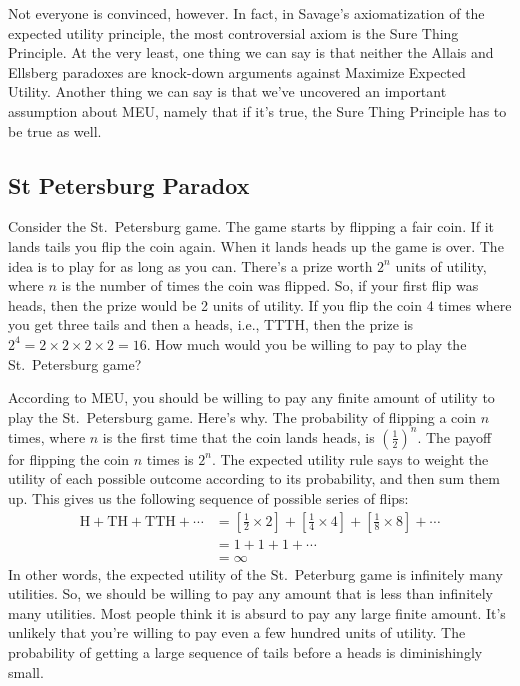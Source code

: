 \documentclass[]{tufte-book}
\begin{document}
Not everyone is convinced, however. In fact, in Savage's axiomatization of the expected utility principle, the most controversial axiom is the Sure Thing Principle. At the very least, one thing we can say is that neither the Allais and Ellsberg paradoxes are knock-down arguments against Maximize Expected Utility. Another thing we can say is that we've uncovered an important assumption about MEU, namely that if it's true, the Sure Thing Principle has to be true as well.

\hypertarget{st-petersburg-paradox}{%
\subsection{St Petersburg Paradox}\label{st-petersburg-paradox}}

Consider the St.~Petersburg game. The game starts by flipping a fair coin. If it lands tails you flip the coin again. When it lands heads up the game is over. The idea is to play for as long as you can. There's a prize worth \(2^n\) units of utility, where \(n\) is the number of times the coin was flipped. So, if your first flip was heads, then the prize would be 2 units of utility. If you flip the coin 4 times where you get three tails and then a heads, i.e., TTTH, then the prize is \(2^4=2\times2\times2\times2=16\). How much would you be willing to pay to play the St.~Petersburg game?

According to MEU, you should be willing to pay any finite amount of utility to play the St.~Petersburg game. Here's why. The probability of flipping a coin \(n\) times, where \(n\) is the first time that the coin lands heads, is \((\frac{1}{2})^n\). The payoff for flipping the coin \(n\) times is \(2^n\). The expected utility rule says to weight the utility of each possible outcome according to its probability, and then sum them up. This gives us the following sequence of possible series of flips:
\[
\begin{aligned}
\text{H} + \text{TH} + \text{TTH} + \cdots &= \left[\frac{1}{2}\times 2\right] + \left[ \frac{1}{4}\times 4 \right] + \left[\frac{1}{8}\times 8 \right] + \cdots \\
&= 1 + 1 + 1 + \cdots \\
&= \infty
\end{aligned}
\]
In other words, the expected utility of the St.~Peterburg game is infinitely many utilities. So, we should be willing to pay any amount that is less than infinitely many utilities. Most people think it is absurd to pay any large finite amount. It's unlikely that you're willing to pay even a few hundred units of utility. The probability of getting a large sequence of tails before a heads is diminishingly small.
\end{document}
